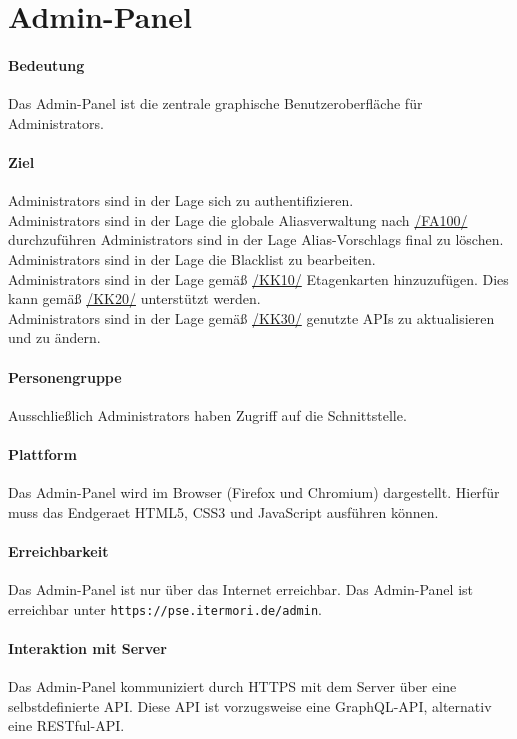 \newpage
\section{Admin-Panel}
\label{Admin-Panel}

\paragraph{Bedeutung}
Das \Gls{Admin-Panel} ist die zentrale graphische Benutzeroberfläche für \Glspl{Administrator}.

\paragraph{Ziel}
\Glspl{Administrator} sind in der Lage sich zu authentifizieren. \\
\Glspl{Administrator} sind in der Lage die globale \Gls{Alias}verwaltung nach \hyperref[/FA100/]{/FA100/} durchzuführen
\Glspl{Administrator} sind in der Lage \Glspl{Alias-Vorschlag} final zu löschen. \\
\Glspl{Administrator} sind in der Lage die \Gls{Blacklist} zu bearbeiten. \\
\Glspl{Administrator} sind in der Lage gemäß \hyperref[/KK10/]{/KK10/} Etagenkarten hinzuzufügen. Dies kann gemäß \hyperref[/KK20/]{/KK20/} unterstützt werden. \\
\Glspl{Administrator} sind in der Lage gemäß \hyperref[/KK30/]{/KK30/} genutzte \Gls{API}s zu aktualisieren und zu ändern.

\paragraph{Personengruppe}
Ausschließlich \Glspl{Administrator} haben Zugriff auf die \Gls{Schnittstelle}.

\paragraph{Plattform}
Das \Gls{Admin-Panel} wird im \Gls{Browser} (\Gls{Firefox} und \Gls{Chromium}) dargestellt.
Hierfür muss das \Gls{Endgeraet} \Gls{HTML5}, \Gls{CSS3} und \Gls{JavaScript} ausführen können.

\paragraph{Erreichbarkeit}
Das \Gls{Admin-Panel} ist nur über das Internet erreichbar. 
Das \Gls{Admin-Panel} ist erreichbar unter \texttt{https://pse.itermori.de/admin}.

\paragraph{Interaktion mit Server}
Das \Gls{Admin-Panel} kommuniziert durch \Gls{HTTPS} mit dem \Gls{Server} über eine selbstdefinierte \Gls{API}.
Diese \Gls{API} ist vorzugsweise eine \Gls{GraphQL}-\Gls{API}, alternativ eine \Gls{REST}ful-\Gls{API}.
